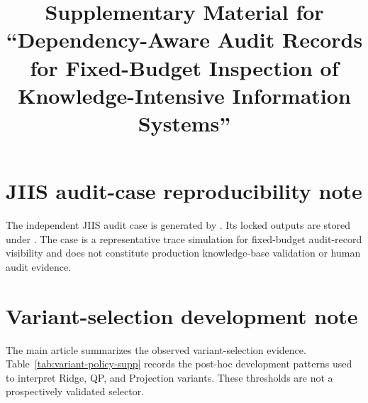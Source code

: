 \documentclass[pdflatex,sn-mathphys-num]{sn-jnl}
\begin{document}
\title[Supplementary Material]{Supplementary Material for ``Dependency-Aware Audit Records for Fixed-Budget Inspection of Knowledge-Intensive Information Systems''}
\author*[1]{ }
\author[1,2]{ }
\maketitle



\section{JIIS audit-case reproducibility note}
The independent JIIS audit case is generated by . Its locked outputs are stored under . The case is a representative trace simulation for fixed-budget audit-record visibility and does not constitute production knowledge-base validation or human audit evidence.

\section{Variant-selection development note}
The main article summarizes the observed variant-selection evidence. Table~\ref{tab:variant-policy-supp} records the post-hoc development patterns used to interpret Ridge, QP, and Projection variants. These thresholds are not a prospectively validated selector.
\end{document}

